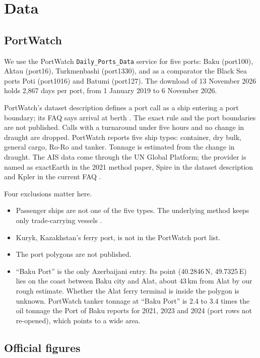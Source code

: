 \documentclass[11pt,a4paper]{article}
\begin{document}
\section{Data}
\label{sec:data}

\subsection{PortWatch}

We use the PortWatch \texttt{Daily\_Ports\_Data} service for five ports: Baku (port100), Aktau (port16), Turkmenbashi (port1330), and as a comparator the Black Sea ports Poti (port1016) and Batumi (port127). The download of 13 November 2026 holds 2,867 days per port, from 1 January 2019 to 6 November 2026.

PortWatch's dataset description defines a port call as a ship entering a port boundary; its FAQ says arrival at berth \cite{portwatch2026faq}. The exact rule and the port boundaries are not published. Calls with a turnaround under five hours and no change in draught are dropped. PortWatch reports five ship types: container, dry bulk, general cargo, Ro-Ro and tanker. Tonnage is estimated from the change in draught. The AIS data come through the UN Global Platform; the provider is named as exactEarth in the 2021 method paper, Spire in the dataset description and Kpler in the current FAQ \cite{portwatch2026dailyports,arslanalp2021tracking,portwatch2026faq}.

Four exclusions matter here.
\begin{itemize}
\item Passenger ships are not one of the five types. The underlying method keeps only trade-carrying vessels \cite{verschuur2021global}.
\item Kuryk, Kazakhstan's ferry port, is not in the PortWatch port list.
\item The port polygons are not published.
\item ``Baku Port'' is the only Azerbaijani entry. Its point (40.2846\,N, 49.7325\,E) lies on the coast between Baku city and Alat, about 43\,km from Alat by our rough estimate. Whether the Alat ferry terminal is inside the polygon is unknown. PortWatch tanker tonnage at ``Baku Port'' is 2.4 to 3.4 times the oil tonnage the Port of Baku reports for 2021, 2023 and 2024 (port rows not re-opened), which points to a wide area.
\end{itemize}

\subsection{Official figures}
\end{document}
